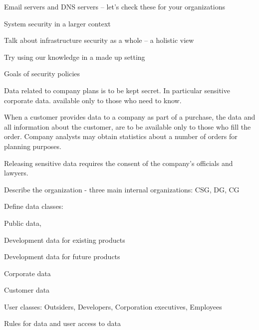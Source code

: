 \documentclass[Screen16to9,17pt]{foils}
\begin{document}
\begin{list2}
\item Email servers and DNS servers -- let's check these for your organizations
\end{list2}




\begin{list2}
\item System security in a larger context
\item Talk about infrastructure security as a whole -- a holistic view
\item Try using our knowledge in a made up setting
\end{list2}




\begin{list2}
\item Goals of security policies
\item Data related to company plans is to be kept secret. In particular sensitive corporate data. available only to those who need to know.
\item When a customer provides data to a company as part of a purchase, the data and all information about the customer, are to be available only to those who fill the order. Company analysts may obtain statistics about a number of orders for planning purposes.
\item Releasing sensitive data requires the consent of the company's officials and lawyers.
\end{list2}


\begin{list1}
\item Describe the organization - three main internal organizations: CSG, DG, CG
\item Define data classes:
\begin{list2}
\item Public data,
\item Development data for existing products
\item Development data for future products
\item Corporate data
\item Customer data
\end{list2}
\item User classes: Outsiders, Developers, Corporation executives, Employees
\item Rules for data and user access to data
\end{list1}
\end{document}
